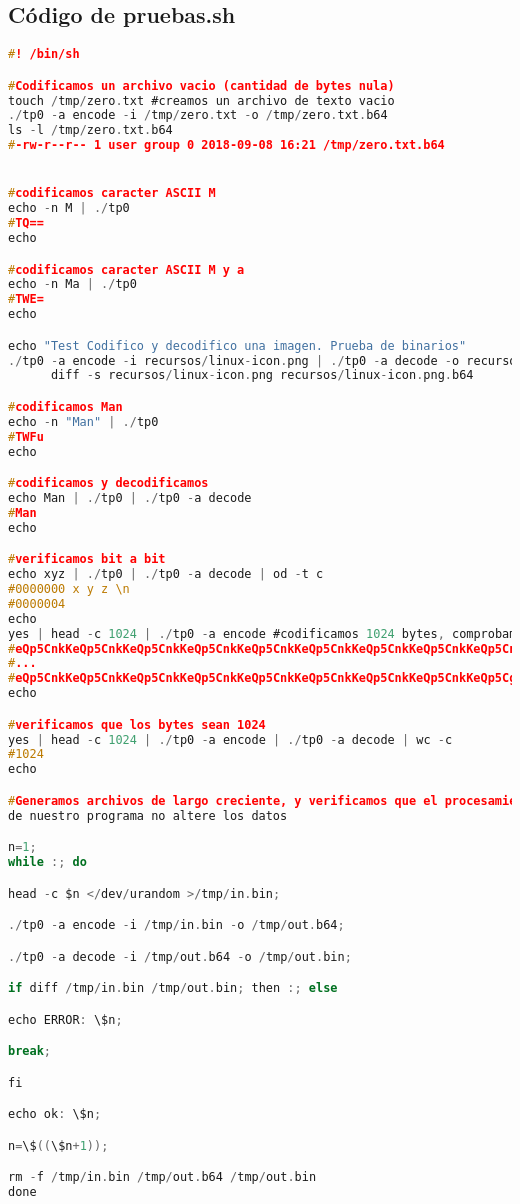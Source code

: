\documentclass[a4paper,11pt, margin=1in]{article}
\begin{document}
\subsection{Código de pruebas.sh}
\begin{lstlisting}[language=c,breaklines=true]
#! /bin/sh

#Codificamos un archivo vacio (cantidad de bytes nula)
touch /tmp/zero.txt #creamos un archivo de texto vacio
./tp0 -a encode -i /tmp/zero.txt -o /tmp/zero.txt.b64
ls -l /tmp/zero.txt.b64
#-rw-r--r-- 1 user group 0 2018-09-08 16:21 /tmp/zero.txt.b64


#codificamos caracter ASCII M
echo -n M | ./tp0 
#TQ==
echo

#codificamos caracter ASCII M y a
echo -n Ma | ./tp0 
#TWE=
echo

echo "Test Codifico y decodifico una imagen. Prueba de binarios"
./tp0 -a encode -i recursos/linux-icon.png | ./tp0 -a decode -o recursos/linux-icon.png.b64 &&
      diff -s recursos/linux-icon.png recursos/linux-icon.png.b64

#codificamos Man
echo -n "Man" | ./tp0 
#TWFu
echo

#codificamos y decodificamos
echo Man | ./tp0 | ./tp0 -a decode
#Man
echo

#verificamos bit a bit
echo xyz | ./tp0 | ./tp0 -a decode | od -t c
#0000000 x y z \n
#0000004
echo
yes | head -c 1024 | ./tp0 -a encode #codificamos 1024 bytes, comprobamos longitud
#eQp5CnkKeQp5CnkKeQp5CnkKeQp5CnkKeQp5CnkKeQp5CnkKeQp5CnkKeQp5CnkKeQp5CnkK
#...
#eQp5CnkKeQp5CnkKeQp5CnkKeQp5CnkKeQp5CnkKeQp5CnkKeQp5CnkKeQp5CnkKeQp5Cg==
echo

#verificamos que los bytes sean 1024
yes | head -c 1024 | ./tp0 -a encode | ./tp0 -a decode | wc -c 
#1024
echo

#Generamos archivos de largo creciente, y verificamos que el procesamiento
de nuestro programa no altere los datos

n=1;
while :; do

head -c $n </dev/urandom >/tmp/in.bin;

./tp0 -a encode -i /tmp/in.bin -o /tmp/out.b64;

./tp0 -a decode -i /tmp/out.b64 -o /tmp/out.bin;

if diff /tmp/in.bin /tmp/out.bin; then :; else

echo ERROR: \$n;

break;

fi

echo ok: \$n;

n=\$((\$n+1));

rm -f /tmp/in.bin /tmp/out.b64 /tmp/out.bin
done
\end{lstlisting}
\end{document}
